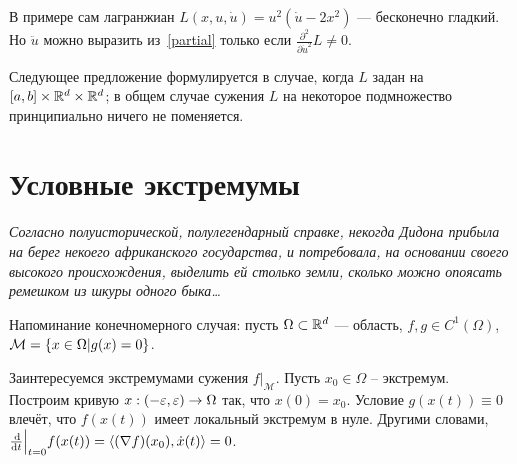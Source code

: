 \documentclass[a4paper]{article}
\begin{document}
    В примере сам лагранжиан $L(x, u, \dot{u}) = u^2(\dot{u} - 2x^2)$ --- бесконечно гладкий.
    Но $\ddot{u}$ можно выразить из~\eqref{partial} только если $\frac{\partial^2}{\partial \dot{u}^2}L \ne 0$.

    Следующее предложение формулируется в случае, когда $L$ задан на $[a, b] \times \mathbb{R}^d \times \mathbb{R}^d$; в общем случае сужения $L$ на некоторое подмножество принципиально ничего не поменяется.
    \section{Условные экстремумы}
    \emph{Согласно полуисторической, полулегендарный справке, некогда Дидона прибыла на берег некоего африканского государства, и потребовала, на основании своего высокого происхождения, выделить ей столько земли, сколько можно опоясать ремешком из шкуры одного быка\ldots}

    Напоминание конечномерного случая:
    пусть $\Omega \subset \mathbb{R}^d$ --- область, $f, g \in C^1(\Omega)$, $\mathcal{M} = \left\{x \in \Omega\middle|g(x) = 0\right\}$.

    Заинтересуемся экстремумами сужения $f\big|_{\mathcal{M}}$.
    Пусть $x_0 \in \Omega$ -- экстремум.
    Построим кривую ${x:(-\varepsilon,\varepsilon)\rightarrow \Omega}$ так, что $x(0) = x_0$.
    Условие $g(x(t)) \equiv 0$ влечёт, что $f(x(t))$ имеет локальный экстремум в нуле.
    Другими словами, $\frac{\operatorname{d}\!}{\operatorname{d}\! t}\Big|_{t = 0}f(x(t)) = \left\langle(\nabla f)(x_0), \dot{x}(t)\right\rangle = 0$.
\end{document}
